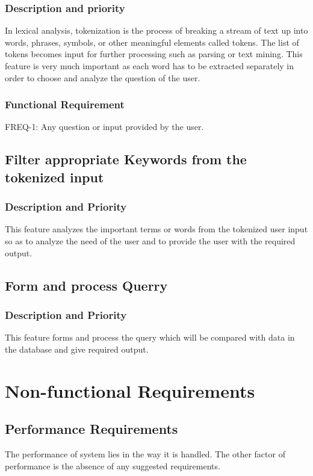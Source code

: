 \subsubsection*{Description and priority}
In lexical analysis, tokenization is the process of breaking a stream of text up into words, phrases, symbols, or other meaningful elements called tokens. The list of tokens becomes input for further processing such as parsing or text mining.  This feature is very much important as each word has to be extracted separately in order to choose and analyze the question of the user.

\subsubsection*{Functional Requirement}
FREQ-1: Any question or input provided by the user.


\subsection*{Filter appropriate Keywords from the tokenized input}
\subsubsection*{Description and Priority}
This feature analyzes the important terms or words from the tokenized user input so as to analyze the need of the user and to provide the user with the required output.

\subsection*{Form and process Querry}
\subsubsection*{Description and Priority}
This feature forms and process the query which will be compared with data in the database and give required output. 

\section{Non-functional Requirements}
\subsection*{Performance Requirements}
The performance of system lies in the way it is handled.  The other factor of performance is the absence of any suggested requirements.

